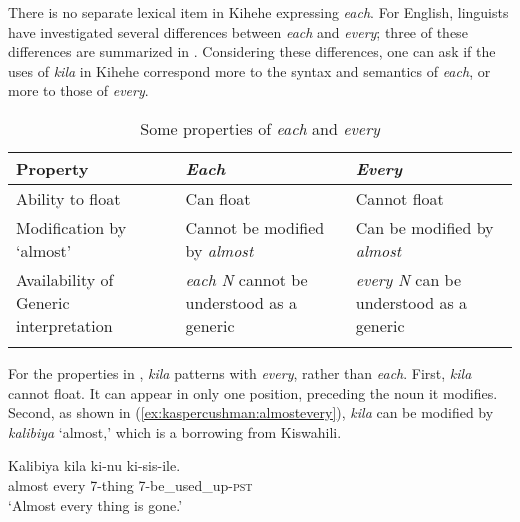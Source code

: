 \documentclass[output=paper,modfonts,nonflat]{langsci/langscibook}
\begin{document}
There is no separate lexical item in Kihehe expressing \textit{each}. For English, linguists have investigated several differences between \textit{each} and \textit{every}; three of these differences are summarized in . Considering these differences, one can ask if the uses of \textit{kila} in Kihehe correspond more to the syntax and semantics of \textit{each}, or more to those of \textit{every}. 

\begin{table}
\small
\caption{Some properties of \emph{each} and \emph{every} \citep{beghelli97}}
\label{tab:kaspercushman:everyeach}
\begin{tabularx}{\textwidth}{XXX}%
\lsptoprule
Property                 & \textit{Each}                                                                                            & \textit{Every}                                                                                                 \\ 
\midrule
Ability to float         & Can float                                                 & Cannot float                                                                                          \\ 
Modification by `almost'  & \nohyphens{Cannot be modified by \textit{almost}}                     & Can be modified by \textit{almost}                                                                           \\ 
\nohyphens{Availability of Generic interpretation}                 & \nohyphens{\textit{each N} cannot be understood as a generic}          & \textit{every N} can be understood as a   generic                  \\ 
\lspbottomrule
\end{tabularx}
\end{table}

For the properties in , \textit{kila} patterns with \textit{every}, rather than \textit{each}.  First, \textit{kila} cannot float. It can appear in only one position, preceding the noun it modifies. Second, as shown in (\ref{ex:kaspercushman:almostevery}), \textit{kila} can be modified by \textit{kalibiya} `almost,' which is a borrowing from Kiswahili. 

\begin{exe}
\ex 
\gll Kalibiya kila ki-nu ki-sis-ile.     \\
almost every 7-thing 7-be\_used\_up-\textsc{pst} \\
\glt `Almost every thing is gone.' \\ \label{ex:kaspercushman:almostevery}
\end{exe}
\end{document}
